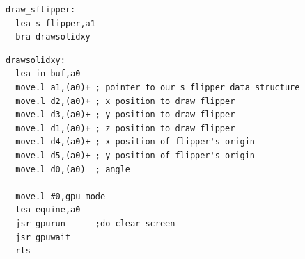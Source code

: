 \begin{lstlisting}
draw_sflipper:
  lea s_flipper,a1
  bra drawsolidxy
\end{lstlisting}

\begin{lstlisting}
drawsolidxy:
  lea in_buf,a0
  move.l a1,(a0)+ ; pointer to our s_flipper data structure
  move.l d2,(a0)+ ; x position to draw flipper
  move.l d3,(a0)+ ; y position to draw flipper
  move.l d1,(a0)+ ; z position to draw flipper
  move.l d4,(a0)+ ; x position of flipper's origin
  move.l d5,(a0)+ ; y position of flipper's origin
  move.l d0,(a0)  ; angle

  move.l #0,gpu_mode
  lea equine,a0
  jsr gpurun      ;do clear screen
  jsr gpuwait
  rts
\end{lstlisting}

